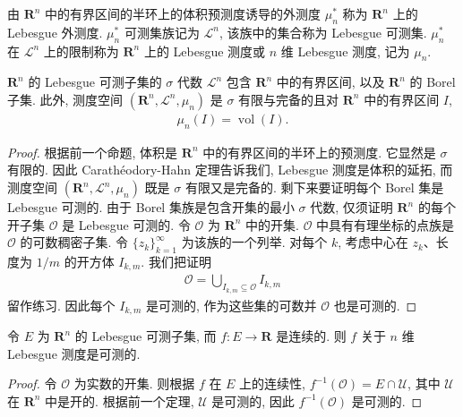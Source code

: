 \documentclass[../../main.tex]{subfiles}
\begin{document}
\begin{definition}\label{definition:ch20-lebesgue测度}
由 $\mathbf{R}^{n}$ 中的有界区间的半环上的体积预测度诱导的外测度 $\mu_{n}^{*}$ 称为 $\mathbf{R}^{n}$ 上的 Lebesgue 外测度. $\mu_{n}^{*}$ 可测集族记为 $\mathcal{L}^{n}$, 该族中的集合称为 Lebesgue 可测集. $\mu_{n}^{*}$ 在 $\mathcal{L}^{n}$ 上的限制称为 $\mathbf{R}^{n}$ 上的 Lebesgue 测度或 $n$ 维 Lebesgue 测度, 记为 $\mu_{n}$.
\end{definition}

\begin{theorem}\label{theorem:ch20-lebesgue基本性质}
$\mathbf{R}^{n}$ 的 Lebesgue 可测子集的 $\sigma$ 代数 $\mathcal{L}^{n}$ 包含 $\mathbf{R}^{n}$ 中的有界区间, 以及 $\mathbf{R}^{n}$ 的 Borel 子集. 此外, 测度空间 $(\mathbf{R}^{n},\mathcal{L}^{n},\mu_{n})$ 是 $\sigma$ 有限与完备的且对 $\mathbf{R}^{n}$ 中的有界区间 $I$,
\begin{align*}
\mu_{n}(I)=\operatorname{vol}(I).
\end{align*}
\end{theorem}

\begin{proof}
根据前一个命题, 体积是 $\mathbf{R}^{n}$ 中的有界区间的半环上的预测度. 它显然是 $\sigma$ 有限的. 因此 Carath\'eodory-Hahn 定理告诉我们, Lebesgue 测度是体积的延拓, 而测度空间 $(\mathbf{R}^{n},\mathcal{L}^{n},\mu_{n})$ 既是 $\sigma$ 有限又是完备的. 剩下来要证明每个 Borel 集是 Lebesgue 可测的. 由于 Borel 集族是包含开集的最小 $\sigma$ 代数, 仅须证明 $\mathbf{R}^{n}$ 的每个开子集 $\mathcal{O}$ 是 Lebesgue 可测的. 令 $\mathcal{O}$ 为 $\mathbf{R}^{n}$ 中的开集. $\mathcal{O}$ 中具有有理坐标的点族是 $\mathcal{O}$ 的可数稠密子集. 令 $\{z_{k}\}_{k=1}^{\infty}$ 为该族的一个列举. 对每个 $k$, 考虑中心在 $z_{k}$、长度为 $1/m$ 的开方体 $I_{k,m}$. 我们把证明
\begin{align}\label{align:ch20-开集方体分解}
\mathcal{O}=\bigcup_{I_{k,m}\subseteq\mathcal{O}}I_{k,m}
\end{align}
留作练习. 因此每个 $I_{k,m}$ 是可测的, 作为这些集的可数并 $\mathcal{O}$ 也是可测的.
\end{proof}

\begin{corollary}\label{corollary:ch20-连续函数可测}
令 $E$ 为 $\mathbf{R}^{n}$ 的 Lebesgue 可测子集, 而 $f:E\to\mathbf{R}$ 是连续的. 则 $f$ 关于 $n$ 维 Lebesgue 测度是可测的.
\end{corollary}

\begin{proof}
令 $\mathcal{O}$ 为实数的开集. 则根据 $f$ 在 $E$ 上的连续性, $f^{-1}(\mathcal{O})=E\cap\mathcal{U}$, 其中 $\mathcal{U}$ 在 $\mathbf{R}^{n}$ 中是开的. 根据前一个定理, $\mathcal{U}$ 是可测的, 因此 $f^{-1}(\mathcal{O})$ 是可测的.
\end{proof}
\end{document}
